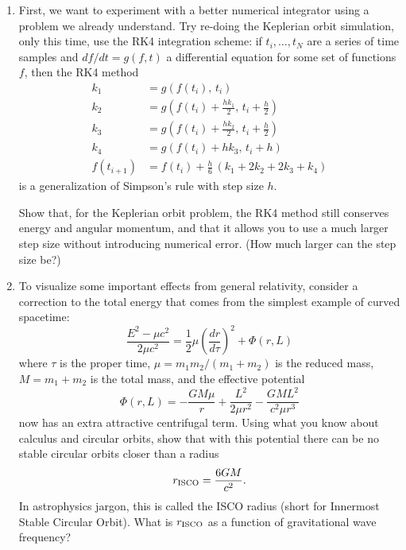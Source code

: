 \documentclass[11pt]{article}
\begin{document}
\begin{enumerate}

\item First, we want to experiment with a better numerical integrator using a problem we already understand. Try re-doing the Keplerian orbit simulation, only this time, use the RK4 integration scheme: if $t_i, \dots, t_N$ are a series of time samples and $df/dt = g(f, t)$ a differential equation for some set of functions $f$, then the RK4 method
\begin{align*}
k_1 &= g(f(t_i), \, t_i) \\
k_2 &= g\left(f(t_i) + \frac{hk_1}{2}, \, t_i + \frac{h}{2}\right) \\
k_3 &= g\left(f(t_i) + \frac{hk_2}{2}, \, t_i + \frac{h}{2}\right) \\
k_4 &= g(f(t_i) + hk_3, \, t_i + h) \\
f(t_{i+1}) &= f(t_i) + \frac{h}{6}\,\left(k_1 + 2k_2 + 2k_3 + k_4\right)
\end{align*}
is a generalization of Simpson's rule with step size $h$.

\hspace{15pt} Show that, for the Keplerian orbit problem, the RK4 method still conserves energy and angular momentum, and that it allows you to use a much larger step size without introducing numerical error. (How much larger can the step size be?)

\item To visualize some important effects from general relativity, consider a correction to the total energy that comes from the simplest example of curved spacetime:
\begin{equation}
\frac{E^2 - \mu c^2}{2\mu c^2} = \frac{1}{2}\mu\left(\frac{dr}{d\tau}\right)^2 + \Phi(r, L)
\end{equation}
where $\tau$ is the proper time, $\mu = m_1 m_2/(m_1 + m_2)$ is the reduced mass, $M = m_1 + m_2$ is the total mass, and the effective potential
\begin{equation}\label{eq:potential}
\Phi(r, L) = -\frac{GM\mu}{r} + \frac{L^2}{2\mu r^2} - \frac{GML^2}{c^2\mu r^3}
\end{equation}
now has an extra attractive centrifugal term. Using what you know about calculus and circular orbits, show that with this potential there can be no stable circular orbits closer than a radius
\begin{equation}\label{eq:ISCO}
r_{\rm ISCO} = \frac{6GM}{c^2}.
\end{equation}
In astrophysics jargon, this is called the ISCO radius (short for Innermost Stable Circular Orbit). What is $r_{\rm ISCO}$ as a function of gravitational wave frequency?


\end{enumerate}
\end{document}
